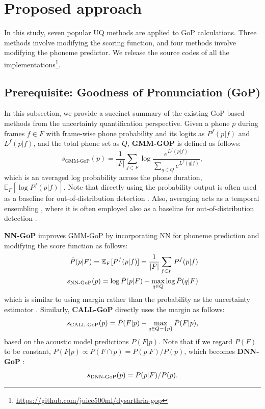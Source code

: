 \section{Proposed approach} \label{sec:gop}
In this study, seven popular UQ methods are applied to GoP calculations.
Three methods involve modifying the scoring function, and four methods involve modifying the phoneme predictor.
We release the source codes of all the implementations\footnote{\url{https://github.com/juice500ml/dysarthria-gop}}.

\subsection{Prerequisite: Goodness of Pronunciation (GoP)}
In this subsection, we provide a succinct summary of the existing GoP-based methods from the uncertainty quantification perspective.
Given a phone $p$ during frames $f \in F$ with frame-wise phone probability and its logits as $P^f(p|f)$ and $L^f(p|f)$, and the total phone set as $Q$, \textbf{GMM-GOP} \cite{witt2000phone} is defined as follows:
\begin{equation}
    s_\text{GMM-GoP}(p) = \frac{1}{|F|} \sum_{f \in F} \log \frac{e^{L^f(p|f)}}{ \sum_{q \in Q} e^{L^f(q|f)}},
\end{equation}
which is an averaged log probability across the phone duration, $\mathbb{E}_F[\log P^f(p|f)]$.
Note that directly using the probability output is often used as a baseline for out-of-distribution detection \cite{hendrycks2017baseline}.
Also, averaging acts as a temporal ensembling \cite{laine2017temporal}, where it is often employed also as a baseline for out-of-distribution detection \cite{ovadia2019can}.


\textbf{NN-GoP} \cite{hu2015improved} improves GMM-GoP by incorporating NN for phoneme prediction and modifying the score function as follows:
\begin{align}
    \Bar{P}(p|F) = \mathbb{E}_F[P^f(p|f)] = \frac{1}{|F|} \sum_{f \in F} P^f(p|f)\\
    s_\text{NN-GoP}(p) = \log \Bar{P}(p|F) - \max_{q \in Q} \log \Bar{P}(q|F)
\end{align}
which is similar to using margin rather than the probability as the uncertainty estimator \cite{kye2022tidal}.
Similarly, \textbf{CALL-GoP} \cite{hu2013new} directly uses the margin as follows:
\begin{align}
    s_\text{CALL-GoP}(p) = \Bar{P}(F|p) - \max_{q \in Q - \{p\}} \Bar{P}(F|p),
\end{align}
based on the acoustic model predictions $P(F|p)$.
Note that if we regard $P(F)$ to be constant, $P(F|p) \propto P(F \cap p) = P(p|F) / P(p)$, which becomes \textbf{DNN-GoP} \cite{hu2015improved}:
\begin{align}
    s_\text{DNN-GoP}(p) = \Bar{P}(p|F) / P(p).
\end{align}



